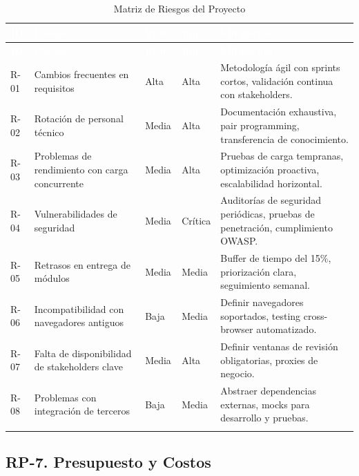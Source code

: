 \documentclass[12pt,a4paper]{article}
\begin{document}
\begin{longtable}{|>{\centering\arraybackslash}p{1.5cm}|>{\raggedright\arraybackslash}p{3.5cm}|>{\centering\arraybackslash}p{1.5cm}|>{\centering\arraybackslash}p{1.5cm}|>{\raggedright\arraybackslash}p{5.5cm}|}
\hline
\rowcolor{headercolor}
\textcolor{white}{\textbf{ID}} & \textcolor{white}{\textbf{Riesgo}} & \textcolor{white}{\textbf{Prob.}} & \textcolor{white}{\textbf{Imp.}} & \textcolor{white}{\textbf{Mitigación}} \\
\hline
\endfirsthead
\hline
\rowcolor{headercolor}
\textcolor{white}{\textbf{ID}} & \textcolor{white}{\textbf{Riesgo}} & \textcolor{white}{\textbf{Prob.}} & \textcolor{white}{\textbf{Imp.}} & \textcolor{white}{\textbf{Mitigación}} \\
\hline
\endhead
\hline
\endlastfoot

R-01 & Cambios frecuentes en requisitos & Alta & Alta & Metodología ágil con sprints cortos, validación continua con stakeholders. \\
\hline
\rowcolor{rowgray}
R-02 & Rotación de personal técnico & Media & Alta & Documentación exhaustiva, pair programming, transferencia de conocimiento. \\
\hline
R-03 & Problemas de rendimiento con carga concurrente & Media & Alta & Pruebas de carga tempranas, optimización proactiva, escalabilidad horizontal. \\
\hline
\rowcolor{rowgray}
R-04 & Vulnerabilidades de seguridad & Media & Crítica & Auditorías de seguridad periódicas, pruebas de penetración, cumplimiento OWASP. \\
\hline
R-05 & Retrasos en entrega de módulos & Media & Media & Buffer de tiempo del 15\%, priorización clara, seguimiento semanal. \\
\hline
\rowcolor{rowgray}
R-06 & Incompatibilidad con navegadores antiguos & Baja & Media & Definir navegadores soportados, testing cross-browser automatizado. \\
\hline
R-07 & Falta de disponibilidad de stakeholders clave & Media & Alta & Definir ventanas de revisión obligatorias, proxies de negocio. \\
\hline
\rowcolor{rowgray}
R-08 & Problemas con integración de terceros & Baja & Media & Abstraer dependencias externas, mocks para desarrollo y pruebas. \\
\hline
\caption{Matriz de Riesgos del Proyecto}
\end{longtable}

\subsection{RP-7. Presupuesto y Costos}
\end{document}
